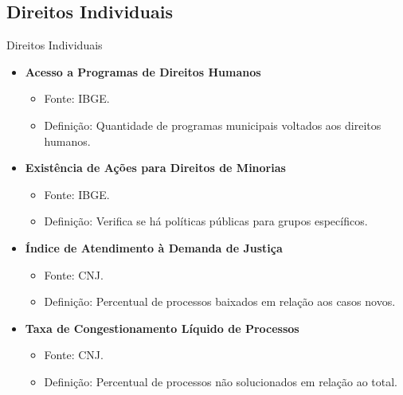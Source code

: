 \documentclass{beamer}
\begin{document}
\subsection{Direitos Individuais}
\begin{frame}{Direitos Individuais}
\begin{itemize}
    \item \textbf{Acesso a Programas de Direitos Humanos}
    \begin{itemize}
        \item Fonte: IBGE.
        \item Definição: Quantidade de programas municipais voltados aos direitos humanos.
    \end{itemize}
    \item \textbf{Existência de Ações para Direitos de Minorias}
    \begin{itemize}
        \item Fonte: IBGE.
        \item Definição: Verifica se há políticas públicas para grupos específicos.
    \end{itemize}
    \item \textbf{Índice de Atendimento à Demanda de Justiça}
    \begin{itemize}
        \item Fonte: CNJ.
        \item Definição: Percentual de processos baixados em relação aos casos novos.
    \end{itemize}
    \item \textbf{Taxa de Congestionamento Líquido de Processos}
    \begin{itemize}
        \item Fonte: CNJ.
        \item Definição: Percentual de processos não solucionados em relação ao total.
    \end{itemize}
\end{itemize}
\end{frame}
\end{document}
